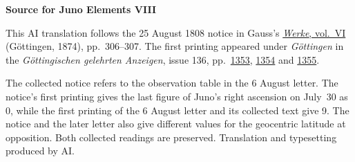 \clearpage\thispagestyle{empty}
\begin{center}\textbf{Source for Juno Elements VIII}\end{center}
\noindent This AI translation follows the 25 August 1808 notice in Gauss’s \href{https://gdz.sub.uni-goettingen.de/id/PPN236007467}{\textit{Werke}, vol.~VI} (Göttingen, 1874), pp.~306--307. The first printing appeared under \textit{Göttingen} in the \textit{Göttingischen gelehrten Anzeigen}, issue 136, pp.~\href{https://manifests.sub.uni-goettingen.de/iiif/image/gdz:PPN319721507_1808:00001359/full/1600,/0/default.jpg}{1353}, \href{https://manifests.sub.uni-goettingen.de/iiif/image/gdz:PPN319721507_1808:00001360/full/1600,/0/default.jpg}{1354} and \href{https://manifests.sub.uni-goettingen.de/iiif/image/gdz:PPN319721507_1808:00001361/full/1600,/0/default.jpg}{1355}.
\par\medskip
The collected notice refers to the observation table in the 6 August letter. The notice’s first printing gives the last figure of Juno’s right ascension on July~30 as 0, while the first printing of the 6 August letter and its collected text give 9. The notice and the later letter also give different values for the geocentric latitude at opposition. Both collected readings are preserved. Translation and typesetting produced by AI.
\clearpage
